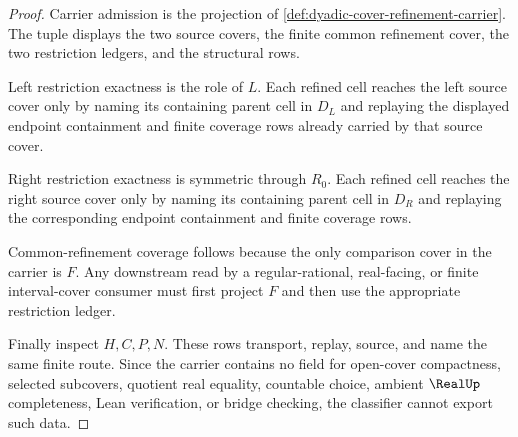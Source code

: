 \begin{proof}
Carrier admission is the projection of \autoref{def:dyadic-cover-refinement-carrier}. The tuple displays the two source covers, the finite common refinement cover, the two restriction ledgers, and the structural rows.

Left restriction exactness is the role of $L$. Each refined cell reaches the left source cover only by naming its containing parent cell in $D_L$ and replaying the displayed endpoint containment and finite coverage rows already carried by that source cover.

Right restriction exactness is symmetric through $R_0$. Each refined cell reaches the right source cover only by naming its containing parent cell in $D_R$ and replaying the corresponding endpoint containment and finite coverage rows.

Common-refinement coverage follows because the only comparison cover in the carrier is $F$. Any downstream read by a regular-rational, real-facing, or finite interval-cover consumer must first project $F$ and then use the appropriate restriction ledger.

Finally inspect $H,C,P,N$. These rows transport, replay, source, and name the same finite route. Since the carrier contains no field for open-cover compactness, selected subcovers, quotient real equality, countable choice, ambient $\RealUp$ completeness, Lean verification, or bridge checking, the classifier cannot export such data.
\end{proof}


